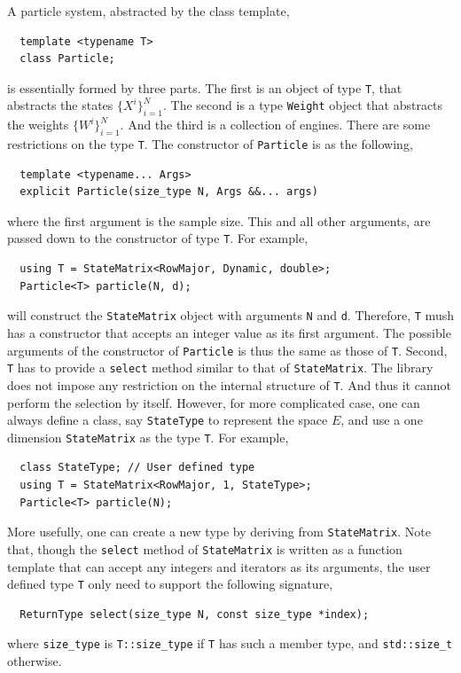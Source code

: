 A particle system, abstracted by the class template,
\begin{Verbatim}
  template <typename T>
  class Particle;
\end{Verbatim}
is essentially formed by three parts. The first is an object of type \verb|T|,
that abstracts the states $\{X^i\}_{i=1}^N$. The second is a type \verb|Weight|
object that abstracts the weights $\{W^i\}_{i=1}^N$. And the third is a
collection of \cppoo{} \rng engines. There are some restrictions on the type
\verb|T|. The constructor of \verb|Particle| is as the following,
\begin{Verbatim}
  template <typename... Args>
  explicit Particle(size_type N, Args &&... args)
\end{Verbatim}
where the first argument is the sample size. This and all other arguments, are
passed down to the constructor of type \verb|T|. For example,
\begin{Verbatim}
  using T = StateMatrix<RowMajor, Dynamic, double>;
  Particle<T> particle(N, d);
\end{Verbatim}
will construct the \verb|StateMatrix| object with arguments \verb|N| and
\verb|d|. Therefore, \verb|T| mush has a constructor that accepts an integer
value as its first argument. The possible arguments of the constructor of
\verb|Particle| is thus the same as those of \verb|T|. Second, \verb|T| has to
provide a \verb|select| method similar to that of \verb|StateMatrix|. The
library does not impose any restriction on the internal structure of \verb|T|.
And thus it cannot perform the selection by itself. However, for more
complicated case, one can always define a class, say \verb|StateType| to
represent the space $E$, and use a one dimension \verb|StateMatrix| as the type
\verb|T|. For example,
\begin{Verbatim}
  class StateType; // User defined type
  using T = StateMatrix<RowMajor, 1, StateType>;
  Particle<T> particle(N);
\end{Verbatim}
More usefully, one can create a new type by deriving from \verb|StateMatrix|.
Note that, though the \verb|select| method of \verb|StateMatrix| is written as
a function template that can accept any integers and iterators as its
arguments, the user defined type \verb|T| only need to support the following
signature,
\begin{Verbatim}
  ReturnType select(size_type N, const size_type *index);
\end{Verbatim}
where \verb|size_type| is \verb|T::size_type| if \verb|T| has such a member
type, and \verb|std::size_t| otherwise.

